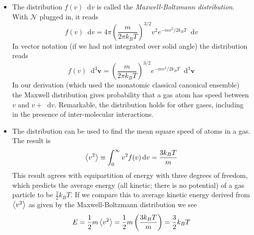 \documentclass[11pt, a4paper]{article}
\newcommand{\diff}{\mathop{}\!\mathrm{d}} %
\begin{document}
\begin{itemize}
	\item The distribution $ f(v) \diff v $ is called the \textit{Maxwell-Boltzmann distribution}. With $ \mathcal{N} $ plugged in, it reads
	\begin{equation*}
		f(v) \diff v = 4\pi \left(\frac{m}{2\pi k_{B}T} \right)^{3/2} v^{2} e^{-mv^{2}/2k_{B}T} \diff v
	\end{equation*}
	In vector notation (if we had not integrated over solid angle) the distribution reads
	\begin{equation*}
		f(v) \diff^{3} \bm{v} = \left(\frac{m}{2\pi k_{B}T} \right)^{3/2} e^{-mv^{2}/2k_{B}T} \diff^{3} \bm{v}
	\end{equation*}
	In our derivation (which used the monatomic classical canonical ensemble) the Maxwell distribution gives probability that a gas atom has speed between $ v $ and $ v + \diff v $. Remarkable, the distribution holds for other gases, including in the presence of inter-molecular interactions.
	
	\item The distribution can be used to find the mean square speed of atoms in a gas. The result is
	\begin{equation*}
		\expval{v^{2}} \equiv \int_{0}^{\infty}v^{2} f(v) \diff v = \frac{3k_{B}T}{m}
	\end{equation*}
	This result agrees with equipartition of energy with three degrees of freedom, which predicts the average energy (all kinetic; there is no potential) of a gas particle to be $ \frac{3}{2}k_{B}T $. If we compare this to average kinetic energy derived from $ \expval{v^{2}} $ as given by the Maxwell-Boltzmann distribution we see
	\begin{equation*}
		E = \frac{1}{2}m \expval{v^{2}} = \frac{1}{2}m \left(\frac{3k_{B}T}{m}\right) = \frac{3}{2}k_{B}T
	\end{equation*}

\end{itemize}
\end{document}
